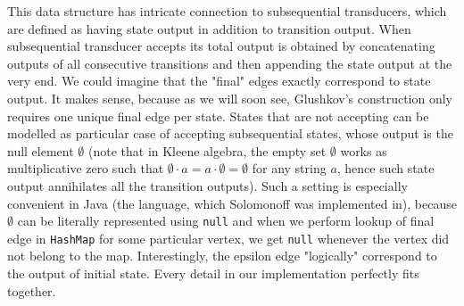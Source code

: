 \documentclass[12pt]{article}
\begin{document}
This data structure has intricate connection to subsequential transducers, which are defined as having state output in addition to transition output. When subsequential transducer accepts its total output is obtained by concatenating outputs of all consecutive transitions and then appending the state output at the very end. We could imagine that the "final" edges exactly correspond to state output. It makes sense, because as we will soon see, Glushkov's construction only requires one unique final edge per state. States that are not accepting can be modelled as particular case of accepting subsequential states, whose output is the null element $\emptyset$ (note that in Kleene algebra, the empty set $\emptyset$ works as multiplicative zero such that $\emptyset \cdot a = a \cdot \emptyset = \emptyset$ for any string $a$, hence such state output annihilates all the transition outputs). Such a setting is especially convenient in Java (the language, which Solomonoff was implemented in), because $\emptyset$ can be literally represented using \texttt{null} and when we perform lookup of final edge in \texttt{HashMap} for some particular vertex, we get \texttt{null} whenever the vertex did not belong to the map. 
Interestingly, the epsilon edge "logically" correspond to the output of initial state. Every detail in our implementation perfectly fits together.
\end{document}
